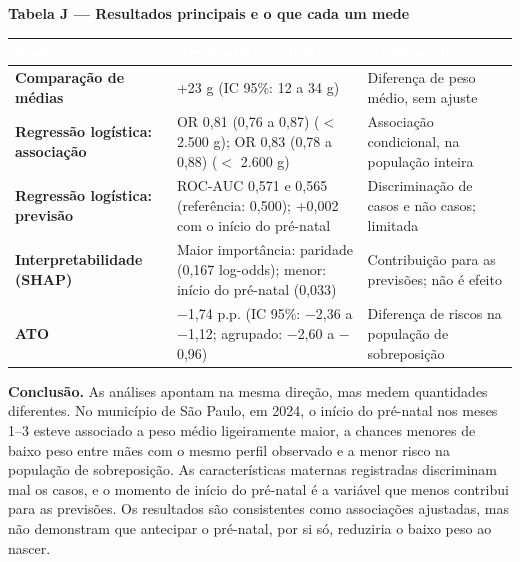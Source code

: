 \documentclass[10pt,a4paper]{article}
\newcommand{\menos}{\ensuremath{-}}
\newcommand{\menor}{\ensuremath{<}}
\begin{document}
\par\vspace{4pt}
{\footnotesize\bfseries\color{iptescuro} Tabela J --- Resultados principais e o que cada um mede\par}\vspace{2pt}
{\footnotesize\renewcommand{\arraystretch}{1.2}\setlength{\tabcolsep}{4pt}
\begin{tabular}{>{\raggedright\arraybackslash}p{} >{\raggedright\arraybackslash}p{} >{\raggedright\arraybackslash}p{}}
\rowcolor{iptazul}\textcolor{white}{\bfseries Análise} & \textcolor{white}{\bfseries Resultado principal} & \textcolor{white}{\bfseries O que mede} \\ \hline
\textbf{Comparação de médias} & +23 g (IC 95\%: 12 a 34 g) & Diferença de peso médio, sem ajuste \\ \hline
\textbf{Regressão logística: associação} & OR 0,81 (0,76 a 0,87) (\menor{} 2.500 g); OR 0,83 (0,78 a 0,88) (\menor{} 2.600 g) & Associação condicional, na população inteira \\ \hline
\textbf{Regressão logística: previsão} & ROC-AUC 0,571 e 0,565 (referência: 0,500); +0,002 com o início do pré-natal & Discriminação de casos e não casos; limitada \\ \hline
\textbf{Interpretabilidade (SHAP)} & Maior importância: paridade (0,167 log-odds); menor: início do pré-natal (0,033) & Contribuição para as previsões; não é efeito \\ \hline
\textbf{ATO} & \menos{}1,74 p.p. (IC 95\%: \menos{}2,36 a \menos{}1,12; agrupado: \menos{}2,60 a \menos{}0,96) & Diferença de riscos na população de sobreposição \\ \hline
\end{tabular}\par}\par\vspace{6pt}


\begin{caixa}{\color{iptescuro}\bfseries Conclusão.} As análises apontam na mesma direção, mas medem quantidades diferentes. No município de São Paulo, em 2024, o início do pré-natal nos meses 1--3 esteve associado a peso médio ligeiramente maior, a chances menores de baixo peso entre mães com o mesmo perfil observado e a menor risco na população de sobreposição. As características maternas registradas discriminam mal os casos, e o momento de início do pré-natal é a variável que menos contribui para as previsões. Os resultados são consistentes como associações ajustadas, mas não demonstram que antecipar o pré-natal, por si só, reduziria o baixo peso ao nascer.\end{caixa}
\end{document}

